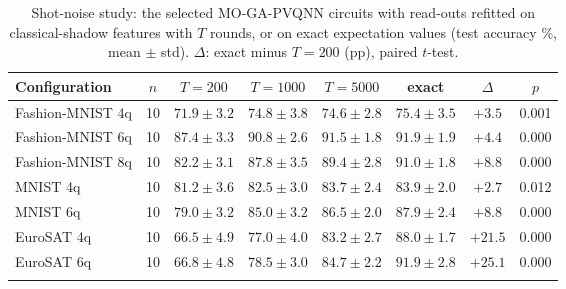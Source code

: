 \begin{table}[t]
\caption{Shot-noise study: the selected MO-GA-PVQNN circuits with read-outs refitted on classical-shadow features with $T$ rounds, or on exact expectation values (test accuracy \%, mean $\pm$ std). $\Delta$: exact minus $T=200$ (pp), paired $t$-test.}\label{tab:shots}
\footnotesize
\begin{tabular}{@{}lccccccc@{}}
\toprule
Configuration & $n$ & $T=200$ & $T=1000$ & $T=5000$ & exact & $\Delta$ & $p$ \\
\midrule
Fashion-MNIST 4q & 10 & $71.9\pm3.2$ & $74.8\pm3.8$ & $74.6\pm2.8$ & $75.4\pm3.5$ & $+3.5$ & 0.001 \\
Fashion-MNIST 6q & 10 & $87.4\pm3.3$ & $90.8\pm2.6$ & $91.5\pm1.8$ & $91.9\pm1.9$ & $+4.4$ & 0.000 \\
Fashion-MNIST 8q & 10 & $82.2\pm3.1$ & $87.8\pm3.5$ & $89.4\pm2.8$ & $91.0\pm1.8$ & $+8.8$ & 0.000 \\
MNIST 4q & 10 & $81.2\pm3.6$ & $82.5\pm3.0$ & $83.7\pm2.4$ & $83.9\pm2.0$ & $+2.7$ & 0.012 \\
MNIST 6q & 10 & $79.0\pm3.2$ & $85.0\pm3.2$ & $86.5\pm2.0$ & $87.9\pm2.4$ & $+8.8$ & 0.000 \\
EuroSAT 4q & 10 & $66.5\pm4.9$ & $77.0\pm4.0$ & $83.2\pm2.7$ & $88.0\pm1.7$ & $+21.5$ & 0.000 \\
EuroSAT 6q & 10 & $66.8\pm4.8$ & $78.5\pm3.0$ & $84.7\pm2.2$ & $91.9\pm2.8$ & $+25.1$ & 0.000 \\
\botrule
\end{tabular}
\end{table}
